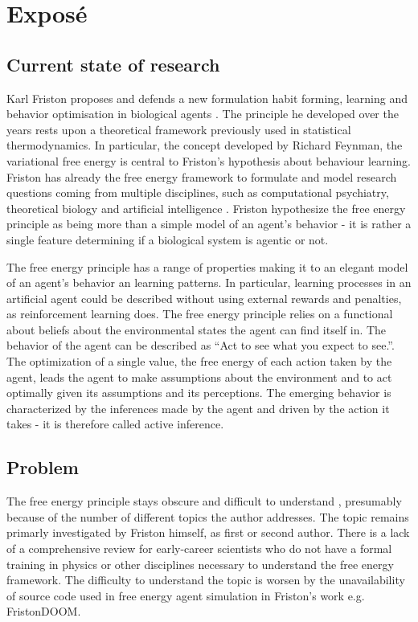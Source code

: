 \documentclass[11pt,
  paper=a4,
  bibliography=totocnumbered,
	captions=tableheading,
	BCOR=10mm
]{scrreprt}
\theoremstyle{definition}
\begin{document}
\tableofcontents
\thispagestyle{empty}

\chapter{Exposé}
\section{Current state of research}

Karl Friston proposes and defends a new formulation habit forming, learning and behavior optimisation in biological agents \cite{}. The principle he developed over the years rests upon a theoretical framework previously used in statistical thermodynamics. In particular, the concept developed by Richard Feynman, the variational free energy is central to Friston's hypothesis about behaviour learning. Friston has already the free energy framework to formulate and model research questions coming from multiple disciplines, such as computational psychiatry, theoretical biology and artificial intelligence \cite{}. Friston hypothesize the free energy principle as being more than a simple model of an agent's behavior - it is rather a single feature determining if a biological system is agentic or not.

The free energy principle has a range of properties making it to an elegant model of an agent's behavior an learning patterns. In particular, learning processes in an artificial agent could be described without using external rewards and penalties, as reinforcement learning does. The free energy principle relies on a functional about beliefs about the environmental states the agent can find itself in. The behavior of the agent can be described as ``Act to see what you expect to see.''. The optimization of a single value, the free energy of each action taken by the agent, leads the agent to make assumptions about the environment and to act optimally given its assumptions and its perceptions. The emerging behavior is characterized by the inferences made by the agent and driven by the action it takes - it is therefore called active inference.

\section{Problem}

The free energy principle stays obscure and difficult to understand \cite{}, presumably because of the number of different topics the author addresses. The topic remains primarly investigated by Friston himself, as first or second author. There is a lack of a comprehensive review for early-career scientists who do not have a formal training in physics or other disciplines necessary to understand the free energy framework. The difficulty to understand the topic is worsen by the unavailability of source code used in free energy agent simulation in Friston's work e.g. FristonDOOM.
\end{document}
